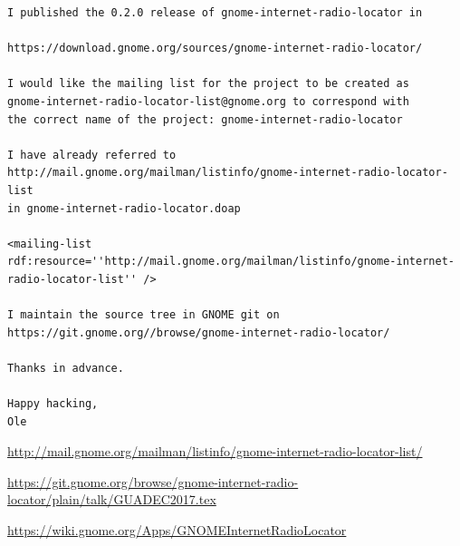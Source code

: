 \documentclass[20pt,landscape]{foils}
\begin{document}
\begin{list1}
\begin{list2}
\begin{tiny}
\begin{verbatim}
I published the 0.2.0 release of gnome-internet-radio-locator in
  
https://download.gnome.org/sources/gnome-internet-radio-locator/
  
I would like the mailing list for the project to be created as
gnome-internet-radio-locator-list@gnome.org to correspond with
the correct name of the project: gnome-internet-radio-locator

I have already referred to
http://mail.gnome.org/mailman/listinfo/gnome-internet-radio-locator-list
in gnome-internet-radio-locator.doap

<mailing-list rdf:resource=''http://mail.gnome.org/mailman/listinfo/gnome-internet-radio-locator-list'' />

I maintain the source tree in GNOME git on https://git.gnome.org//browse/gnome-internet-radio-locator/

Thanks in advance.

Happy hacking,
Ole
\end{verbatim}
\end{tiny}
  \item \begin{tiny}\url{http://mail.gnome.org/mailman/listinfo/gnome-internet-radio-locator-list/}\end{tiny}    
  \end{list2}  
\end{list1}


\url{https://git.gnome.org/browse/gnome-internet-radio-locator/plain/talk/GUADEC2017.tex}


\url{https://wiki.gnome.org/Apps/GNOMEInternetRadioLocator}
\end{document}
